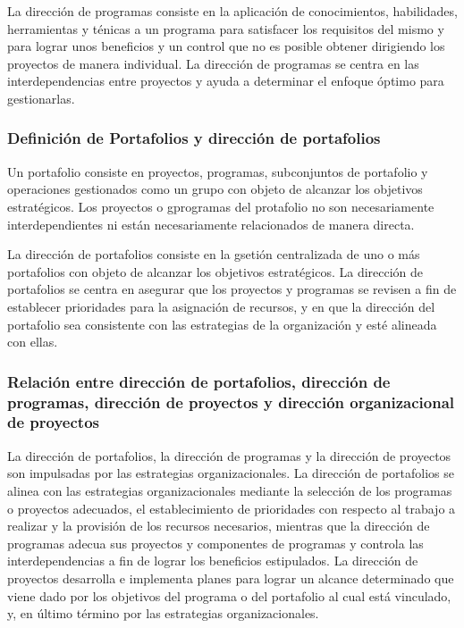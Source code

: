 La dirección de programas consiste en la aplicación de conocimientos, habilidades, herramientas y ténicas a un programa para satisfacer los requisitos del mismo y para lograr unos beneficios y un control que no es posible obtener dirigiendo los proyectos de manera individual. La dirección de programas se centra en las interdependencias entre proyectos y ayuda a determinar el enfoque óptimo para gestionarlas.

\subsubsection{Definición de Portafolios y dirección de portafolios}

Un portafolio consiste en proyectos, programas, subconjuntos de portafolio y operaciones gestionados como un grupo con objeto de alcanzar los objetivos estratégicos. Los proyectos o gprogramas del protafolio no son necesariamente interdependientes ni están necesariamente relacionados de manera directa.

La dirección de portafolios consiste en la gsetión centralizada de uno o más portafolios con objeto de alcanzar los objetivos estratégicos. La dirección de portafolios se centra en asegurar que los proyectos y programas se revisen a fin de establecer prioridades para la asignación de recursos, y en que la dirección del portafolio sea consistente con las estrategias de la organización y esté alineada con ellas.

\subsubsection{Relación entre dirección de portafolios, dirección de programas, dirección de proyectos y dirección organizacional de proyectos}

La dirección de portafolios, la dirección de programas y la dirección de proyectos son impulsadas por las estrategias organizacionales. La dirección de portafolios se alinea con las estrategias organizacionales mediante la selección de los programas o proyectos adecuados, el establecimiento de prioridades con respecto al trabajo a realizar y la provisión de los recursos necesarios, mientras que la dirección de programas adecua sus proyectos y componentes de programas y controla las interdependencias a fin de lograr los beneficios estipulados. La dirección de proyectos desarrolla e implementa planes para lograr un alcance determinado que viene dado por los objetivos del programa o del portafolio al cual está vinculado, y, en último término por las estrategias organizacionales.

